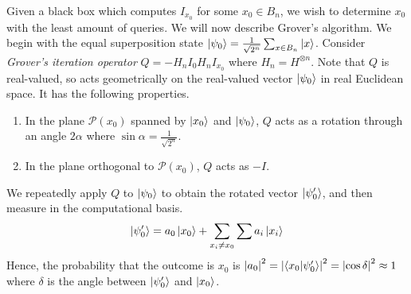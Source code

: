 Given a black box which computes \( I_{x_0} \) for some \( x_0 \in B_n \), we wish to determine \( x_0 \) with the least amount of queries.
We will now describe Grover's algorithm.
We begin with the equal superposition state \( \ket{\psi_0} = \frac{1}{\sqrt{2^n}} \sum_{x \in B_n} \ket{x} \).
Consider \emph{Grover's iteration operator} \( Q = -H_n I_0 H_n I_{x_0} \) where \( H_n = H^{\otimes n} \).
Note that \( Q \) is real-valued, so acts geometrically on the real-valued vector \( \ket{\psi_0} \) in real Euclidean space.
It has the following properties.
\begin{enumerate}
    \item In the plane \( \mathcal P(x_0) \) spanned by \( \ket{x_0} \) and \( \ket{\psi_0} \), \( Q \) acts as a rotation through an angle \( 2\alpha \) where \( \sin \alpha = \frac{1}{\sqrt{2^n}} \).
    \item In the plane orthogonal to \( \mathcal P(x_0) \), \( Q \) acts as \( -I \).
\end{enumerate}
We repeatedly apply \( Q \) to \( \ket{\psi_0} \) to obtain the rotated vector \( \ket{\psi_0'}\), and then measure in the computational basis.
\[ \ket{\psi_0'} = a_0 \ket{x_0} + \sum_{x_i \neq x_0} \sum a_i \ket{x_i} \]
Hence, the probability that the outcome is \( x_0 \) is \( \abs{a_0}^2 = \abs{\ip{x_0}{\psi_0'}}^2 = \abs{\cos \delta}^2 \approx 1 \) where \( \delta \) is the angle between \( \ket{\psi_0'} \) and \( \ket{x_0} \).

